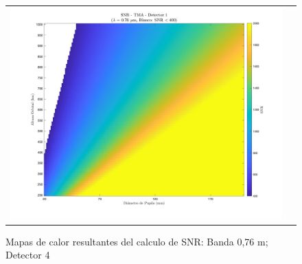 \begin{landscape}
\begin{figure}[p]
\begin{tabular}{cc}
\includegraphics[width=0.48\linewidth]{4.Payload/SNR/SNR_Lambda3_Detector4_Telescopio4_heatmap.jpg} \\
\end{tabular}
\caption{Mapas de calor resultantes del calculo de SNR: Banda 0,76 \textmu m; Detector 4}
\end{figure}
\end{landscape}


